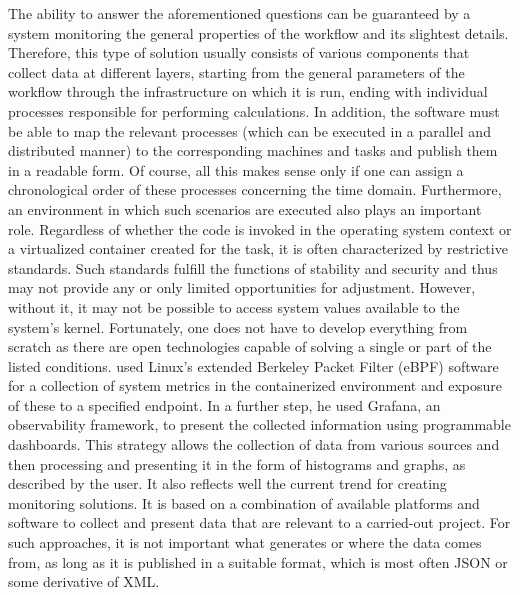 \documentclass[a4paper,journal]{IEEEtran}
\begin{document}
	The ability to answer the aforementioned questions can be guaranteed by a system monitoring the general properties of the workflow and its slightest details. Therefore, this type of solution usually consists of various components that collect data at different layers, starting from the general parameters of the workflow through the infrastructure on which it is run, ending with individual processes responsible for performing calculations. In addition, the software must be able to map the relevant processes (which can be executed in a parallel and distributed manner) to the corresponding machines and tasks and publish them in a readable form. Of course, all this makes sense only if one can assign a chronological order of these processes concerning the time domain. Furthermore, an environment in which such scenarios are executed also plays an important role. Regardless of whether the code is invoked in the operating system context or a virtualized container created for the task, it is often characterized by restrictive standards. Such standards fulfill the functions of stability and security and thus may not provide any or only limited opportunities for adjustment. However, without it, it may not be possible to access system values available to the system's kernel. 
	Fortunately, one does not have to develop everything from scratch as there are open technologies capable of solving a single or part of the listed conditions. \citeauthor{levin2020viperproberethinkingmicroservice} used Linux’s extended Berkeley Packet Filter (eBPF)\cite{ebpf} software for a collection of system metrics in the containerized environment and exposure of these to a specified endpoint. In a further step, he used Grafana\cite{grafana}, an observability framework, to present the collected information using programmable dashboards. This strategy allows the collection of data from various sources and then processing and presenting it in the form of histograms and graphs, as described by the user. It also reflects well the current trend for creating monitoring solutions. It is based on a combination of available platforms and software to collect and present data that are relevant to a carried-out project. For such approaches, it is not important what generates or where the data comes from, as long as it is published in a suitable format, which is most often JSON or some derivative of XML.
	
	
\end{document}
